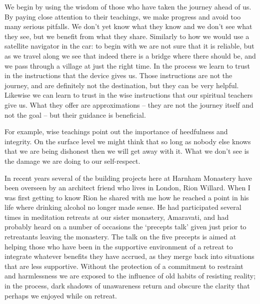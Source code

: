 We begin by using the wisdom of those who have taken the journey ahead
of us. By paying close attention to their teachings, we make progress
and avoid too many serious pitfalls. We don't yet know what they know
and we don't see what they see, but we benefit from what they share.
Similarly to how we would use a satellite navigator in the car: to begin
with we are not sure that it is reliable, but as we travel along we see
that indeed there is a bridge where there should be, and we pass through
a village at just the right time. In the process we learn to trust in
the instructions that the device gives us. Those instructions are not
the journey, and are definitely not the destination, but they can be
very helpful. Likewise we can learn to trust in the wise instructions
that our spiritual teachers give us. What they offer are approximations
-- they are not the journey itself and not the goal -- but their guidance
is beneficial.

For example, wise teachings point out the importance of heedfulness and
integrity. On the surface level we might think that so long as nobody
else knows that we are being dishonest then we will get away with it.
What we don't see is the damage we are doing to our self-respect.

In recent years several of the building projects here at Harnham
Monastery have been overseen by an architect friend who lives in London,
Rion Willard. When I was first getting to know Rion he shared with me
how he reached a point in his life where drinking alcohol no longer made
sense. He had participated several times in meditation retreats at our
sister monastery, Amaravati, and had probably heard on a number of
occasions the `precepts talk' given just prior to retreatants leaving
the monastery. The talk on the five precepts is aimed at helping those
who have been in the supportive environment of a retreat to integrate
whatever benefits they have accrued, as they merge back into situations
that are less supportive. Without the protection of a commitment to
restraint and harmlessness we are exposed to the influence of old habits
of resisting reality; in the process, dark shadows of unawareness return
and obscure the clarity that perhaps we enjoyed while on retreat.


